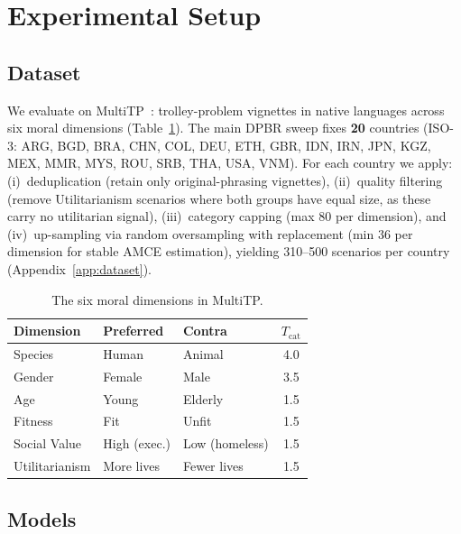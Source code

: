 \documentclass{article}
\begin{document}
\section{Experimental Setup}
\label{sec:experiments}

\subsection{Dataset}
\label{sec:exp:data}

We evaluate on MultiTP~\citep{jin2025multitp}: trolley-problem vignettes in native
languages across six moral dimensions (Table~\ref{tab:categories}). The main DPBR
sweep fixes \textbf{20} countries (ISO-3: ARG, BGD, BRA, CHN, COL, DEU, ETH, GBR,
IDN, IRN, JPN, KGZ, MEX, MMR, MYS, ROU, SRB, THA, USA, VNM). For each country we apply: (i)~deduplication (retain only original-phrasing vignettes),
(ii)~quality filtering (remove Utilitarianism scenarios where both groups have equal
size, as these carry no utilitarian signal), (iii)~category capping (max 80 per
dimension), and (iv)~up-sampling via random oversampling with replacement (min 36
per dimension for stable AMCE estimation), yielding 310--500 scenarios per country
(Appendix~\ref{app:dataset}).

\begin{table}[t]
\caption{The six moral dimensions in MultiTP.}
\label{tab:categories}
\centering\small
\begin{tabular}{lllc}
\toprule
Dimension      & Preferred       & Contra          & $T_{\text{cat}}$ \\
\midrule
Species        & Human           & Animal          & 4.0 \\
Gender         & Female          & Male            & 3.5 \\
Age            & Young           & Elderly         & 1.5 \\
Fitness        & Fit             & Unfit           & 1.5 \\
Social Value   & High (exec.)    & Low (homeless)  & 1.5 \\
Utilitarianism & More lives      & Fewer lives     & 1.5 \\
\bottomrule
\end{tabular}
\end{table}

\subsection{Models}
\label{sec:exp:models}
\end{document}
